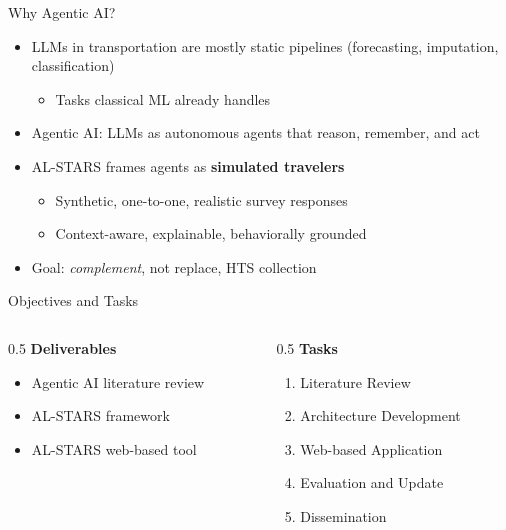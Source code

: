 \documentclass{beamer}
\begin{document}
\begin{frame}{Why Agentic AI?}
\begin{itemize}
\item LLMs in transportation are mostly static pipelines (forecasting, imputation, classification)
\begin{itemize}
\item Tasks classical ML already handles
\end{itemize}
\item Agentic AI: LLMs as autonomous agents that reason, remember, and act
\item AL-STARS frames agents as \textbf{simulated travelers}
\begin{itemize}
\item Synthetic, one-to-one, realistic survey responses
\item Context-aware, explainable, behaviorally grounded
\end{itemize}
\item Goal: \emph{complement}, not replace, HTS collection
\end{itemize}
\end{frame}


\begin{frame}{Objectives and Tasks}
\begin{columns}
\begin{column}{0.5\textwidth}
\textbf{Deliverables}
\begin{itemize}
\item Agentic AI literature review
\item AL-STARS framework
\item AL-STARS web-based tool
\end{itemize}
\end{column}
\begin{column}{0.5\textwidth}
\textbf{Tasks}
\begin{enumerate}
\item Literature Review
\item Architecture Development
\item Web-based Application
\item Evaluation and Update
\item Dissemination
\end{enumerate}
\end{column}
\end{columns}
\end{frame}
\end{document}
